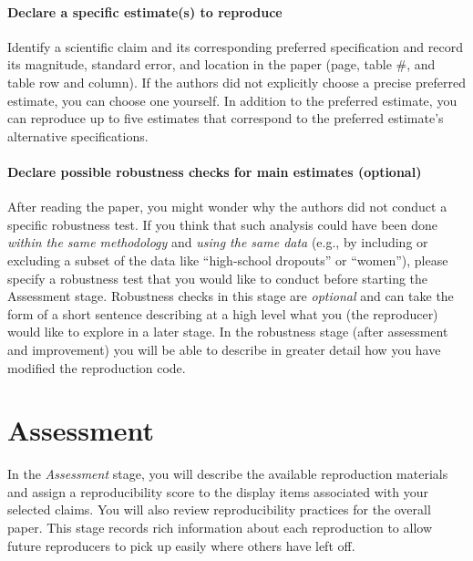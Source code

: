 \documentclass[
]{book}
\begin{document}
\hypertarget{declare-a-specific-estimates-to-reproduce}{%
\subsubsection*{Declare a specific estimate(s) to reproduce}\label{declare-a-specific-estimates-to-reproduce}}

Identify a scientific claim and its corresponding preferred specification and record its magnitude, standard error, and location in the paper (page, table \#, and table row and column). If the authors did not explicitly choose a precise preferred estimate, you can choose one yourself. In addition to the preferred estimate, you can reproduce up to five estimates that correspond to the preferred estimate's alternative specifications.

\hypertarget{declare-possible-robustness-checks-for-main-estimates-optional}{%
\subsubsection*{Declare possible robustness checks for main estimates (optional)}\label{declare-possible-robustness-checks-for-main-estimates-optional}}

After reading the paper, you might wonder why the authors did not conduct a specific robustness test. If you think that such analysis could have been done \emph{within the same methodology} and \emph{using the same data} (e.g., by including or excluding a subset of the data like ``high-school dropouts'' or ``women''), please specify a robustness test that you would like to conduct before starting the Assessment stage. Robustness checks in this stage are \emph{optional} and can take the form of a short sentence describing at a high level what you (the reproducer) would like to explore in a later stage. In the robustness stage (after assessment and improvement) you will be able to describe in greater detail how you have modified the reproduction code.

\hypertarget{assessment}{%
\chapter{Assessment}\label{assessment}}

In the \emph{Assessment} stage, you will describe the available reproduction materials and assign a reproducibility score to the display items associated with your selected claims. You will also review reproducibility practices for the overall paper. This stage records rich information about each reproduction to allow future reproducers to pick up easily where others have left off.
\end{document}
